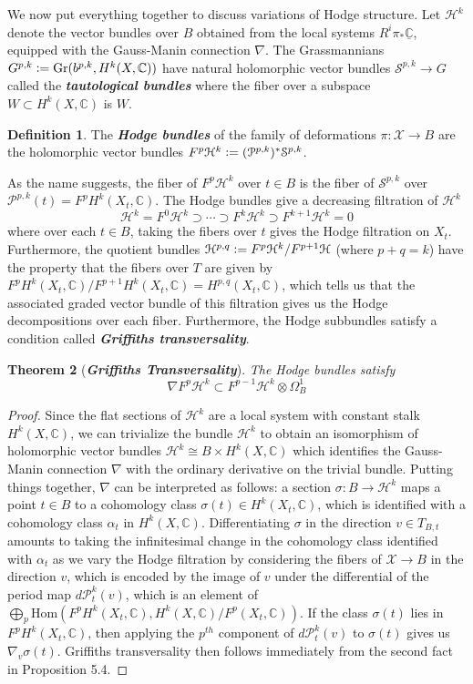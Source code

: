 \documentclass[psamsfonts, 12pt]{amsart}
\newtheorem{thm}{Theorem}[section]
\theoremstyle{definition}
\newtheorem{defn}[thm]{Definition}
\theoremstyle{remark}
\newcommand{\ib}[1]{\textbf{\textit{#1}}}
\newcommand{\C}{\mathbb{C}}
\newcommand{\defeq}{\vcentcolon=}
\begin{document}
We now put everything together to discuss variations of Hodge structure. Let
$\mathcal{H}^k$ denote the vector bundles over $B$ obtained from the local systems
$R^i\pi_*\underline{\C}$, equipped with the Gauss-Manin connection $\nabla$.
The Grassmannians $G^{p,k} \defeq \mathrm{Gr}(b^{p,k},H^k(X,\C))$ have natural
holomorphic vector bundles $\mathcal{S}^{p,k} \to G$ called the
\ib{tautological bundles} where the fiber over a subspace $W \subset H^k(X,\C)$ is $W$.
%
\begin{defn}
The \ib{Hodge bundles} of the family of deformations $\pi : \mathcal{X} \to B$
are the holomorphic vector bundles
$F^p\mathcal{H}^k \defeq (\mathcal{P}^{p,k})^*\mathcal{S}^{p,k}$.
\end{defn}
%
As the name suggests, the fiber of $F^p\mathcal{H}^k$ over $t \in B$ is the fiber
of $\mathcal{S}^{p,k}$ over $\mathcal{P}^{p,k}(t) = F^pH^k(X_t,\C)$. The
Hodge bundles give a decreasing filtration of $\mathcal{H}^k$
\[
\mathcal{H}^k = F^0\mathcal{H}^k \supset \cdots \supset F^k\mathcal{H}^k
\supset F^{k+1}\mathcal{H}^k = 0
\]
where over each $t \in B$, taking the fibers over $t$ gives the Hodge filtration on
$X_t$. Furthermore, the quotient bundles
$\mathcal{H}^{p,q} \defeq F^p\mathcal{H}^k/F^{p+1}\mathcal{H}$ (where $p+q = k$)
have the property that the fibers over $T$ are given by
$F^pH^k(X_t,\C)/F^{p+1}H^k(X_t,\C) = H^{p,q}(X_t,\C)$, which tells us that
the associated graded vector bundle of this filtration gives us the
Hodge decompositions over each fiber. Furthermore, the Hodge subbundles satisfy
a condition called \ib{Griffiths transversality}.
%
\begin{thm}[\ib{Griffiths Transversality}]
The Hodge bundles satisfy
\[
\nabla F^p\mathcal{H}^k \subset F^{p-1}\mathcal{H}^k \otimes \Omega^1_B
\]
\end{thm}
%
\begin{proof}
Since the flat sections of $\mathcal{H}^k$ are a local system with constant
stalk $H^k(X,\C)$, we can trivialize the bundle $\mathcal{H}^k$ to
obtain an isomorphism of holomorphic vector bundles
$\mathcal{H}^k \cong B \times H^k(X,\C)$ which identifies the Gauss-Manin
connection $\nabla$ with the ordinary derivative on the trivial bundle. Putting
things together, $\nabla$ can be interpreted as follows: a section
$\sigma : B \to \mathcal{H}^k$ maps a point $t \in B$ to a cohomology class
$\sigma(t) \in H^k(X_t,\C)$, which is identified with a cohomology class
$\alpha_t$ in $H^k(X,\C)$. Differentiating $\sigma$ in the direction
$v \in T_{B,t}$ amounts to taking the infinitesimal change in the cohomology
class identified with $\alpha_t$ as we vary the Hodge filtration by considering
the fibers of $\mathcal{X} \to B$ in the direction $v$, which
is encoded by the image of $v$ under the differential of the period map
$d\mathcal{P}^k_t(v)$, which is an element of
$\bigoplus_p \mathrm{Hom}(F^pH^k(X_t,\C), H^k(X,\C)/F^p(X_t,\C))$.
If the class $\sigma(t)$ lies in $F^pH^k(X_t,\C)$, then applying
the $p^{th}$ component of $d\mathcal{P}^k_t(v)$ to $\sigma(t)$ gives us
$\nabla_v\sigma(t)$. Griffiths transversality then follows immediately
from the second fact in Proposition 5.4.
\end{proof}
\end{document}
